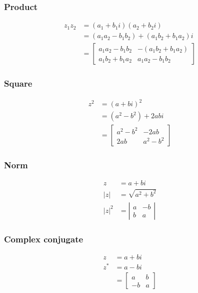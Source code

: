 \subsubsection*{Product}
$$
\begin{aligned}
z_{1} z_{2} & =\left(a_{1}+b_{1} i\right)\left(a_{2}+b_{2} i\right) \\
& =\left(a_{1} a_{2}-b_{1} b_{2}\right)+\left(a_{1} b_{2}+b_{1} a_{2}\right) i \\
& =\left[\begin{array}{cc}
a_{1} a_{2}-b_{1} b_{2} & -\left(a_{1} b_{2}+b_{1} a_{2}\right) \\
a_{1} b_{2}+b_{1} a_{2} & a_{1} a_{2}-b_{1} b_{2}
\end{array}\right]
\end{aligned}
$$

\subsubsection*{Square}
$$
\begin{aligned}
z^{2} & =(a+b i)^{2} \\
& =\left(a^{2}-b^{2}\right)+2 a b i \\
& =\left[\begin{array}{cc}
a^{2}-b^{2} & -2 a b \\
2 a b & a^{2}-b^{2}
\end{array}\right]
\end{aligned}
$$

\subsubsection*{Norm}

$$
\begin{aligned}
z & =a+b i \\
|z| & =\sqrt{a^{2}+b^{2}} \\
|z|^{2} & =\left|\begin{array}{cc}
a & -b \\
b & a
\end{array}\right|
\end{aligned}
$$

\subsubsection*{Complex conjugate}
$$
\begin{aligned}
z & =a+b i \\
z^{*} & =a-b i \\
& =\left[\begin{array}{cc}
a & b \\
-b & a
\end{array}\right]
\end{aligned}
$$

